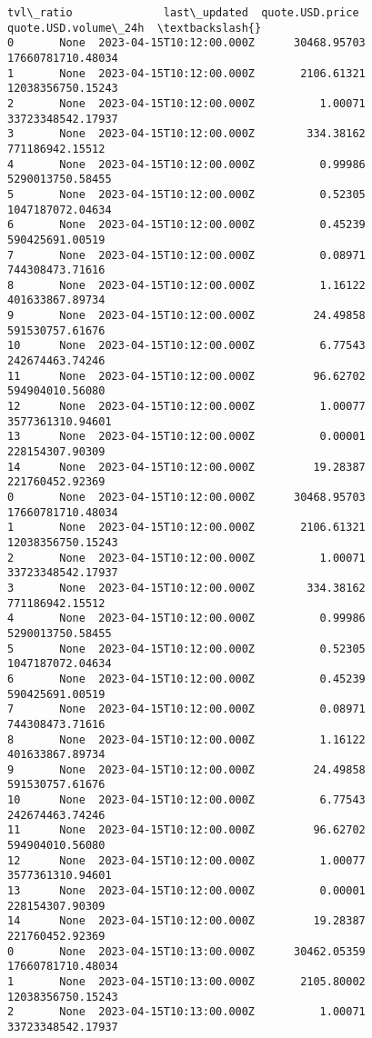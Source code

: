 \documentclass[11pt]{article}
\begin{document}
\begin{tcolorbox}[breakable, size=fbox, boxrule=.5pt, pad at break*=1mm, opacityfill=0]
\begin{Verbatim}[commandchars=\\\{\}]
   tvl\_ratio              last\_updated  quote.USD.price  quote.USD.volume\_24h  \textbackslash{}
0       None  2023-04-15T10:12:00.000Z      30468.95703     17660781710.48034
1       None  2023-04-15T10:12:00.000Z       2106.61321     12038356750.15243
2       None  2023-04-15T10:12:00.000Z          1.00071     33723348542.17937
3       None  2023-04-15T10:12:00.000Z        334.38162       771186942.15512
4       None  2023-04-15T10:12:00.000Z          0.99986      5290013750.58455
5       None  2023-04-15T10:12:00.000Z          0.52305      1047187072.04634
6       None  2023-04-15T10:12:00.000Z          0.45239       590425691.00519
7       None  2023-04-15T10:12:00.000Z          0.08971       744308473.71616
8       None  2023-04-15T10:12:00.000Z          1.16122       401633867.89734
9       None  2023-04-15T10:12:00.000Z         24.49858       591530757.61676
10      None  2023-04-15T10:12:00.000Z          6.77543       242674463.74246
11      None  2023-04-15T10:12:00.000Z         96.62702       594904010.56080
12      None  2023-04-15T10:12:00.000Z          1.00077      3577361310.94601
13      None  2023-04-15T10:12:00.000Z          0.00001       228154307.90309
14      None  2023-04-15T10:12:00.000Z         19.28387       221760452.92369
0       None  2023-04-15T10:12:00.000Z      30468.95703     17660781710.48034
1       None  2023-04-15T10:12:00.000Z       2106.61321     12038356750.15243
2       None  2023-04-15T10:12:00.000Z          1.00071     33723348542.17937
3       None  2023-04-15T10:12:00.000Z        334.38162       771186942.15512
4       None  2023-04-15T10:12:00.000Z          0.99986      5290013750.58455
5       None  2023-04-15T10:12:00.000Z          0.52305      1047187072.04634
6       None  2023-04-15T10:12:00.000Z          0.45239       590425691.00519
7       None  2023-04-15T10:12:00.000Z          0.08971       744308473.71616
8       None  2023-04-15T10:12:00.000Z          1.16122       401633867.89734
9       None  2023-04-15T10:12:00.000Z         24.49858       591530757.61676
10      None  2023-04-15T10:12:00.000Z          6.77543       242674463.74246
11      None  2023-04-15T10:12:00.000Z         96.62702       594904010.56080
12      None  2023-04-15T10:12:00.000Z          1.00077      3577361310.94601
13      None  2023-04-15T10:12:00.000Z          0.00001       228154307.90309
14      None  2023-04-15T10:12:00.000Z         19.28387       221760452.92369
0       None  2023-04-15T10:13:00.000Z      30462.05359     17660781710.48034
1       None  2023-04-15T10:13:00.000Z       2105.80002     12038356750.15243
2       None  2023-04-15T10:13:00.000Z          1.00071     33723348542.17937

\end{Verbatim}
\end{tcolorbox}
\end{document}
